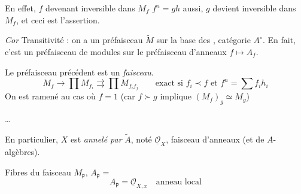 \documentclass[11pt,a4paper]{article}
\begin{document}
En effet, $f$ devenant inversible dans $M_f$  $f^n = gh$ aussi, $g$ devient inversible dans $M_f$, et ceci est l'assertion.

\emph{Cor} Transitivité : on a un préfaisceau $\widetilde{M}$ sur la base des \ill{}, catégorie  \ill{} $A^\circ$. En fait, c'est un préfaisceau de modules sur le préfaisceau d'anneaux $f \mapsto A_f$.


\emph{\ill{}} Le préfaisceau précédent est un \emph{faisceau}.
\[
M_f \longrightarrow \prod M_{f_i} \rightrightarrows \prod M_{f_i f_j} \qquad \text{exact si } f_i \prec f \text{ et } f^n = \sum f_i h_i
\]
On est ramené au cas où $f = 1$  (car $f \succ g$ implique $(M_f)_g \simeq M_g$)

…

En particulier, $X$ est \emph{annelé par} $\widetilde{A}$, noté $\underline{\mathcal{O}}_X$, faisceau \struck{\ill{}} d'anneaux (et  de $A$-algèbres).

Fibres du faisceau \quad $M_{\mathfrak{p}}$, $A_{\mathfrak{p}} =$ \quad [$S \subset A$ stable par multiplication donc filtrant pour \struck{\ill{}} $\succ$, donc $MS^{-1} = \varinjlim_{f \in S} M_f = \{ \frac{x}{f^n} \ldots$ règles de calcul…]
\[
A_{\mathfrak{p}} = \underline{\mathcal{O}}_{X,x} \quad \text{anneau local}
\]
\end{document}
